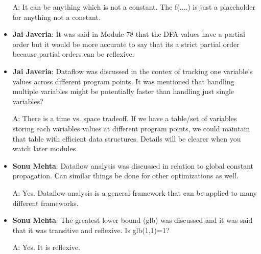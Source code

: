 \begin{itemize}
    A: It can be anything which is not a constant. The f(....) is just a placeholder for anything not a constant.
    
    \item \textbf{Jai Javeria}: It was said in Module 78 that the DFA values have a partial order but it would be more accurate to say that its a strict partial order because partial orders can be reflexive.
    
    \item \textbf{Jai Javeria}: Dataflow was discussed in the contex of tracking one variable's values across different program points. It was mentioned that handling multiple variables might be potentially faster than handling just single variables?
    
    A: There is a time vs. space tradeoff. If we have a table/set of variables storing each variables values at different program points, we could maintain that table with efficient data structures. Details will be clearer when you watch later modules.
    
    \item \textbf{Sonu Mehta}: Dataflow analysis was discussed in relation to global constant propagation. Can similar things be done for other optimizations as well.
    
    A: Yes. Dataflow analysis is a general framework that can be applied to many different frameworks.
    
    \item \textbf{Sonu Mehta}: The greatest lower bound (glb) was discussed and it was said that it was transitive and reflexive. Is glb(1,1)=1?
    
    A: Yes. It is reflexive.
\end{itemize}
